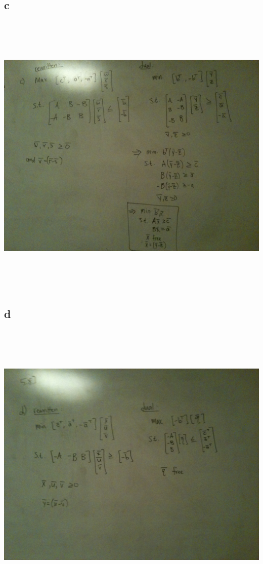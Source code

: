 \documentclass[a4paper,12pt]{article}
\begin{document}
\subsection*{c}
\includegraphics[width=14cm, height=14cm, keepaspectratio=true]{image/fiveeight-c.jpg}
\subsection*{d}
\includegraphics[width=14cm, height=14cm, keepaspectratio=true]{image/fiveeight-d.jpg}
\end{document}
